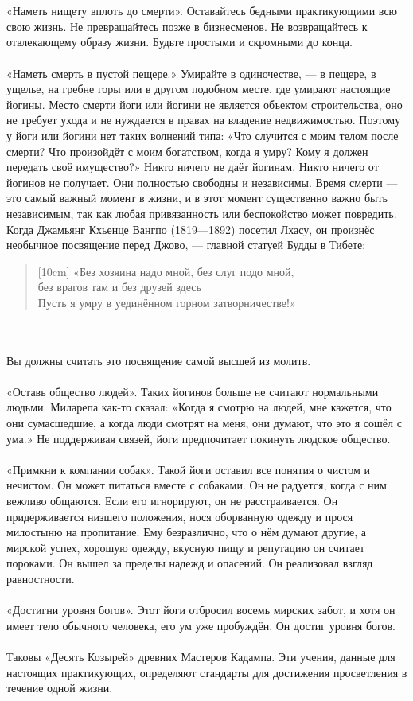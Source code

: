 \\ \\ «Наметь нищету вплоть до смерти». Оставайтесь бедными практикующими всю свою жизнь. Не превращайтесь позже в бизнесменов. Не возвращайтесь к отвлекающему образу жизни. Будьте простыми и скромными до конца.
\newpage
\\ \\ «Наметь смерть в пустой пещере.» Умирайте в одиночестве, — в пещере, в ущелье, на гребне горы или в другом подобном месте, где умирают настоящие йогины. Место смерти йоги или йогини не является объектом строительства, оно не требует ухода и не нуждается в правах на владение недвижимостью. Поэтому у йоги или йогини нет таких волнений типа: «Что случится с моим телом после смерти? Что произойдёт с моим богатством, когда я умру? Кому я должен передать своё имущество?» Никто ничего не даёт йогинам. Никто ничего от йогинов не получает. Они полностью свободны и независимы. Время смерти — это самый важный момент в жизни, и в этот момент существенно важно быть независимым, так как любая привязанность или беспокойство может повредить. Когда Джамьянг Кхьенце Вангпо (1819—1892) посетил Лхасу, он произнёс необычное посвящение перед Джово, — главной статуей Будды в Тибете:
\begin{verse}[10cm]
«Без хозяина надо мной, без слуг подо мной, \\
\indent без врагов там и без друзей здесь\\
Пусть я умру в уединённом горном затворничестве!»
\end{verse}
\\ \\ Вы должны считать это посвящение самой высшей из молитв.
\\ \\ «Оставь общество людей». Таких йогинов больше не считают нормальными людьми. Миларепа как-то сказал: «Когда я смотрю на людей, мне кажется, что они сумасшедшие, а когда люди смотрят на меня, они думают, что это я сошёл с ума.» Не поддерживая связей, йоги предпочитает покинуть людское общество.
\\ \\ «Примкни к компании собак». Такой йоги оставил все понятия о чистом и нечистом. Он может питаться вместе с собаками. Он не радуется, когда с ним вежливо общаются. Если его игнорируют, он не расстраивается. Он придерживается низшего положения, нося оборванную одежду и прося милостыню на пропитание. Ему безразлично, что о нём думают другие, а мирской успех, хорошую одежду, вкусную пищу и репутацию он считает пороками. Он вышел за пределы надежд и опасений. Он реализовал взгляд равностности.
\\ \\ «Достигни уровня богов». Этот йоги отбросил восемь мирских забот, и хотя он имеет тело обычного человека, его ум уже пробуждён. Он достиг уровня богов.
\\ \\ Таковы «Десять Козырей» древних Мастеров Кадампа. Эти учения, данные для настоящих практикующих, определяют стандарты для достижения просветления в течение одной жизни.
